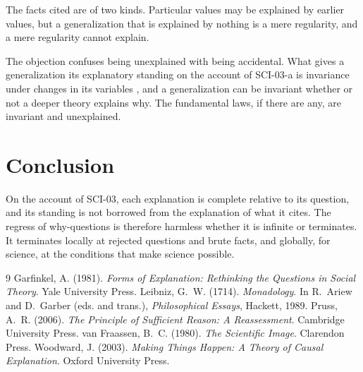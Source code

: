 \documentclass{situationist-preprint}
\begin{document}
\begin{objection}[Generalizations]
The facts cited are of two kinds. Particular values may be explained by earlier values, but a generalization that is explained by nothing is a mere regularity, and a mere regularity cannot explain.
\end{objection}

\begin{reply}
The objection confuses being unexplained with being accidental. What gives a generalization its explanatory standing on the account of SCI-03-a is invariance under changes in its variables \citep{Woodward2003}, and a generalization can be invariant whether or not a deeper theory explains why. The fundamental laws, if there are any, are invariant and unexplained.
\end{reply}

\section{Conclusion}\label{s:conclusion}

On the account of SCI-03, each explanation is complete relative to its question, and its standing is not borrowed from the explanation of what it cites. The regress of why-questions is therefore harmless whether it is infinite or terminates. It terminates locally at rejected questions and brute facts, and globally, for science, at the conditions that make science possible.

\begin{thebibliography}{9}
 Garfinkel, A. (1981). \emph{Forms of Explanation: Rethinking the Questions in Social Theory}. Yale University Press.
 Leibniz, G.~W. (1714). \emph{Monadology}. In R.~Ariew and D.~Garber (eds. and trans.), \emph{Philosophical Essays}, Hackett, 1989.
 Pruss, A.~R. (2006). \emph{The Principle of Sufficient Reason: A Reassessment}. Cambridge University Press.
 van Fraassen, B.~C. (1980). \emph{The Scientific Image}. Clarendon Press.
 Woodward, J. (2003). \emph{Making Things Happen: A Theory of Causal Explanation}. Oxford University Press.
\end{thebibliography}
\end{document}
